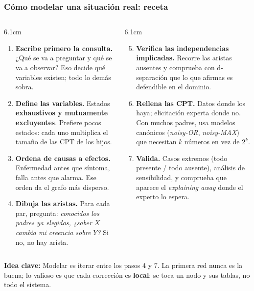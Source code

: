 \documentclass[aspectratio=169, 10pt]{beamer}
\newcommand{\idea}[1]{%
	\begin{tcolorbox}[colback=AccentGreen!6, colframe=AccentGreen, arc=3pt,
		width=\textwidth, boxsep=1pt, left=5pt, right=5pt, top=2pt, bottom=2pt,
		fontupper=\small]
		\RaggedRight\textbf{Idea clave:} #1
	\end{tcolorbox}
}
\begin{document}
\begin{frame}
\frametitle{Cómo modelar una situación real: receta}
\footnotesize
\begin{columns}[T]
\begin{column}{6.1cm}
\begin{enumerate}
	\item \textbf{Escribe primero la consulta.} ¿Qué se va a preguntar y qué se va a observar? Eso decide qué variables existen; todo lo demás sobra.
	\item \textbf{Define las variables.} Estados \textbf{exhaustivos y mutuamente excluyentes}. Prefiere pocos estados: cada uno multiplica el tamaño de las CPT de los hijos.
	\item \textbf{Ordena de causas a efectos.} Enfermedad antes que síntoma, falla antes que alarma. Ese orden da el grafo más disperso.
	\item \textbf{Dibuja las aristas.} Para cada par, pregunta: \emph{conocidos los padres ya elegidos, ¿saber $X$ cambia mi creencia sobre $Y$?} Si no, no hay arista.
\end{enumerate}
\end{column}
\begin{column}{6.1cm}
\begin{enumerate}
	\setcounter{enumi}{4}
	\item \textbf{Verifica las independencias implicadas.} Recorre las aristas ausentes y comprueba con d-separación que lo que afirmas es defendible en el dominio.
	\item \textbf{Rellena las CPT.} Datos donde los haya; elicitación experta donde no. Con muchos padres, usa modelos canónicos (\emph{noisy-OR}, \emph{noisy-MAX}) que necesitan $k$ números en vez de $2^{k}$.
	\item \textbf{Valida.} Casos extremos (todo presente / todo ausente), análisis de sensibilidad, y comprueba que aparece el \emph{explaining away} donde el experto lo espera.
\end{enumerate}
\end{column}
\end{columns}
\vspace{0.4em}
\idea{Modelar es iterar entre los pasos 4 y 7. La primera red nunca es la buena; lo valioso es que cada corrección es \textbf{local}: se toca un nodo y sus tablas, no todo el sistema.}
\end{frame}
\end{document}
